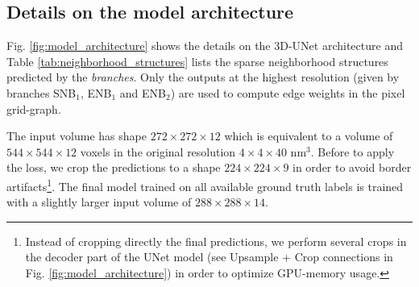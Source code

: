 \subsection{Details on the model architecture}\label{sec:arch_details_suppl}
Fig. \ref{fig:model_architecture} shows the details on the 3D-UNet architecture and Table \ref{tab:neighborhood_structures} lists the sparse neighborhood structures predicted by the \emph{\sparseBr branches}. Only the outputs at the highest resolution (given by branches SNB$_1$, ENB$_1$ and ENB$_2$) are used to compute edge weights in the pixel grid-graph. 

The input volume has shape $272 \times 272\times12$ which is equivalent to a volume of $544\times 544\times 12$ voxels in the original resolution $4\times 4\times 40$ nm$^3$. Before to apply the loss, we crop the predictions to a shape $224\times 224\times 9$ in order to avoid border artifacts\footnote{Instead of cropping directly the final predictions, we perform several crops in the decoder part of the UNet model (see Upsample + Crop connections in Fig. \ref{fig:model_architecture}) in order to optimize GPU-memory usage.}.
The final model trained on all available ground truth labels is trained with a slightly larger input volume of $288\times 288\times 14$.



